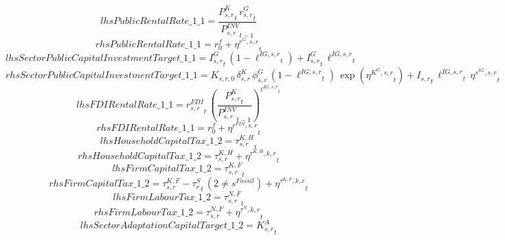 \begin{dmath*}
lhsPublicRentalRate\_1\_1 = \frac{{{P^K_{s,r}}}_{t}\, {{r^G_{s,r}}}_{t}}{{{P^{INV}_{s,r}}}_{t-1}}
\end{dmath*}
\begin{dmath*}
rhsPublicRentalRate\_1\_1 = {{r^f_0}}+{{\eta^{r^G,s,r}}}_{t}
\end{dmath*}
\begin{dmath*}
lhsSectorPublicCapitalInvestmentTarget\_1\_1 = {{I^G_{s,r}}}_{t}\, \left(1-{{\ell^{IG,s,r}}}_{t}\right)+{{I^G_{s,r}}}_{t}\, {{\ell^{IG,s,r}}}_{t}
\end{dmath*}
\begin{dmath*}
rhsSectorPublicCapitalInvestmentTarget\_1\_1 = {{K_{s,r,0}}}\, {{\delta^{K}_{s,r}}}\, {{\phi^{G}_{s,r}}}\, \left(1-{{\ell^{IG,s,r}}}_{t}\right)\, \exp\left({{\eta^{K^G,s,r}}}_{t}\right)+{{I_{s,r}}}_{t}\, {{\ell^{IG,s,r}}}_{t}\, {{\eta^{s^{IG},s,r}}}_{t}
\end{dmath*}
\begin{dmath*}
lhsFDIRentalRate\_1\_1 = {{r^{FDI}_{s,r}}}_{t}\, \left(\frac{{{P^K_{s,r}}}_{t}}{{{P^{INV}_{s,r}}}_{t-1}}\right)^{{{\ell^{IG,s,r}}}_{t}}
\end{dmath*}
\begin{dmath*}
rhsFDIRentalRate\_1\_1 = {{r^f_0}}+{{\eta^{r^{FDI},s,r}}}_{t}
\end{dmath*}
\begin{dmath*}
lhsHouseholdCapitalTax\_1\_2 = {{\tau^{K,H}_{s,r}}}_{t}
\end{dmath*}
\begin{dmath*}
rhsHouseholdCapitalTax\_1\_2 = {{\tau^{K,H}_{s,r}}}+{{\eta^{\tau^{K,H},k,r}}}_{t}
\end{dmath*}
\begin{dmath*}
lhsFirmCapitalTax\_1\_2 = {{\tau^{K,F}_{s,r}}}_{t}
\end{dmath*}
\begin{dmath*}
rhsFirmCapitalTax\_1\_2 = {{\tau^{K,F}_{s,r}}}-{{\tau^{S}_{r}}}_{t}\, \left(2\neq {{s^{Fossil}}}\right)+{{\eta^{\tau^{K,F},k,r}}}_{t}
\end{dmath*}
\begin{dmath*}
lhsFirmLabourTax\_1\_2 = {{\tau^{N,F}_{s,r}}}_{t}
\end{dmath*}
\begin{dmath*}
rhsFirmLabourTax\_1\_2 = {{\tau^{N,F}_{s,r}}}+{{\eta^{\tau^{N},k,r}}}_{t}
\end{dmath*}
\begin{dmath*}
lhsSectorAdaptationCapitalTarget\_1\_2 = {{K^{A}_{s,r}}}_{t}
\end{dmath*}

